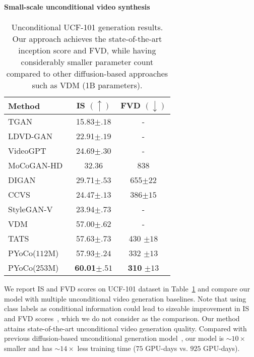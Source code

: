 \documentclass[10pt,twocolumn,letterpaper]{article}
\newcommand{\ediffivideo}{PYoCo\xspace}
\newcommand{\tabcspace}{\vspace{-2mm}}
\newcommand{\tabspace}{\vspace{-4mm}}
\begin{document}
\paragraph{Small-scale unconditional video synthesis}

\setlength{\tabcolsep}{8pt}
\renewcommand{\arraystretch}{1}

\begin{table}[t]
\centering
\caption{Unconditional UCF-101 generation results. Our approach achieves the state-of-the-art inception score and FVD, while having considerably smaller parameter count compared to other diffusion-based approaches such as VDM (1B parameters).}
\tabcspace
\label{tab:main_small_scale}
\begin{tabular}{lcc}
\toprule
Method & IS $(\uparrow)$  & FVD  $(\downarrow)$  \\
\midrule
TGAN~\cite{saito2017temporal} & 15.83\tiny{$\pm .18$} & -  \\
LDVD-GAN~\cite{kahembwe2020lower} & 22.91\tiny{$\pm .19$}   & - \\
VideoGPT~\cite{yan2021videogpt} & 24.69\tiny{$\pm .30$}   & - \\
MoCoGAN-HD~\cite{tian2021a}  & 32.36\phantom{\tiny{$\pm .00$}} & 838 \\
DIGAN~\cite{yu2021generating} & 29.71\tiny{$\pm .53$}   & 655\tiny{$\pm 22$}   \\
CCVS~\cite{le2021ccvs}  & 24.47\tiny{$\pm .13$} & 386\tiny{$\pm 15$} \\
StyleGAN-V~\cite{skorokhodov2021stylegan}  & 23.94\tiny{$\pm .73$} & - \\
VDM~\cite{ho2022video}  & 57.00\tiny{$\pm .62$} & - \\
TATS~\cite{ge2022long}  & 57.63\tiny{$\pm .73$} & 430 \tiny{$\pm 18$} \\
\rowcolor[HTML]{DFDFDF} 
\ediffivideo ($112$M) & 57.93\tiny{$\pm .24$} & 332 \tiny{$\pm 13$} \\
\rowcolor[HTML]{DFDFDF} 
\ediffivideo ($253$M) & \textbf{60.01}\tiny{$\pm .51$} & \textbf{310} \tiny{$\pm 13$} \\
\bottomrule
\end{tabular}
\tabspace
\end{table}


%
 We report IS and FVD scores on UCF-101 dataset in Table~\ref{tab:main_small_scale} and compare our model with multiple unconditional video generation baselines. Note that using class labels as conditional information could lead to sizeable improvement in IS and FVD scores~\cite{ge2022long}, which we do not consider as the comparison. Our method attains state-of-the-art unconditional video generation quality. Compared with previous diffusion-based unconditional generation model~\cite{ho2022video}, our model is $\sim10\times$ smaller and has $\sim14\times$ less training time ($75$ GPU-days vs. $925$ GPU-days). 
\end{document}
